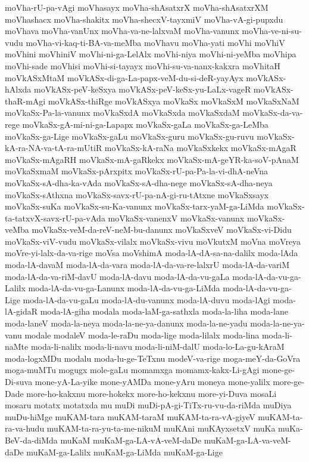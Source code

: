 {moVha-rU-pa-vAgi
moVhasayx
moVha-shAsatxrX
moVha-shAsatxrXM
moVhashacx
moVha-shakitx
moVha-shecxV-tayxmiV
moVha-vA-gi-pupxdu
moVhava
moVha-vanUnx
moVha-va-ne-lalxvaM
moVha-vanunx
moVha-ve-ni-su-vudu
moVha-vi-kaq-ti-BA-va-meMba
moVhavu
moVha-yati
moVhi
moVhiV
moVhini
moVhiniV
moVhi-ni-ga-LelAlx
moVhi-niya
moVhi-ni-yeMba
moVhipa
moVhi-sade
moVhisi
moVhi-si-tayayx
moVhi-su-va-nanx-kakxra
moVhitaH
moVkASxMtaM
moVkASx-di-ga-La-papx-veM-du-si-deR-yayAyx
moVkASx-hAlxda
moVkASx-peV-keSxya
moVkASx-peV-keSx-yu-LaLx-vageR
moVkASx-thaR-mAgi
moVkASx-thiRge
moVkASxya
moVkaSx
moVkaSxM
moVkaSxNaM
moVkaSx-Pa-la-vanunx
moVkaSxdA
moVkaSxda
moVkaSxdaM
moVkaSx-da-va-rege
moVkaSx-gA-mi-ni-ga-Lapapx
moVkaSx-gaLa
moVkaSx-ga-LeMba
moVkaSx-ga-Lige
moVkaSx-gaLu
moVkaSx-guru
moVkaSx-gu-ruvu
moVkaSx-kA-ra-NA-va-tA-ra-mUtiR
moVkaSx-kA-raNa
moVkaSxkekx
moVkaSx-mAgaR
moVkaSx-mAgaRH
moVkaSx-mA-gaRkekx
moVkaSx-mA-geYR-ka-soV-pAnaM
moVkaSxmaM
moVkaSx-pArxpitx
moVkaSx-rU-pa-Pa-la-vi-dhA-neVna
moVkaSx-sA-dha-ka-vAda
moVkaSx-sA-dha-nege
moVkaSx-sA-dha-neya
moVkaSx-sAthxna
moVkaSx-savx-rU-pa-nA-gi-ru-tAtxne
moVkaSxsayx
moVkaSx-suKa
moVkaSx-su-Ka-vanunx
moVkaSx-tarx-yaM-ga-LiMda
moVkaSx-ta-tatxvX-savx-rU-pa-vAda
moVkaSx-vanenxV
moVkaSx-vanunx
moVkaSx-veMba
moVkaSx-veM-da-reV-neM-bu-danunx
moVkaSxveV
moVkaSx-vi-Didu
moVkaSx-viV-vudu
moVkaSx-vilalx
moVkaSx-vivu
moVkutxM
moVna
moVreya
moVre-yi-lalx-da-va-rige
moVsa
moVshimA
moda-lA-dA-sa-na-dalilx
moda-lAda
moda-lA-davaM
moda-lA-da-vara
moda-lA-da-va-re-lalxrU
moda-lA-da-variM
moda-lA-da-va-riM-davU
moda-lA-davu
moda-lA-da-vu-gaLa
moda-lA-da-vu-ga-Lalilx
moda-lA-da-vu-ga-Lanunx
moda-lA-da-vu-ga-LiMda
moda-lA-da-vu-ga-Lige
moda-lA-da-vu-gaLu
moda-lA-du-vanunx
moda-lA-duvu
moda-lAgi
moda-lA-gidaR
moda-lA-giha
modala
moda-laM-ga-sathxla
moda-la-liha
moda-lane
moda-laneV
moda-la-neya
moda-la-ne-ya-danunx
moda-la-ne-yadu
moda-la-ne-ya-vanu
modale
modaleV
moda-le-raDu
moda-lige
moda-lilalx
moda-lina
moda-li-naMte
moda-li-nalilx
moda-li-navu
moda-li-niM-dalU
moda-lo-La-gu-kAraM
moda-logxMDu
modalu
moda-lu-ge-TeTxnu
modeV-va-rige
moga-meY-da-GoVra
moga-muMTu
mogugx
mole-gaLu
momamxga
momamx-kakx-Li-gAgi
mone-ge-Di-suva
mone-yA-La-yike
mone-yAMDa
mone-yAru
moneya
mone-yalilx
more-ge-Dade
more-ho-kakxnu
more-hokekx
more-ho-kekxnu
more-yi-Duva
mosaLi
mosaru
motatx
motatxda
mu
muDi
muDi-pA-gi-TiTx-ru-vu-da-riMda
muDiya
muDu-hiMge
muKAM-tara
muKAM-taraM
muKAM-ta-ra-vA-giyeV
muKAM-ta-ra-va-hudu
muKAM-ta-ra-yu-ta-me-nikuM
muKAni
muKAyxsetxV
muKa
muKa-BeV-da-diMda
muKaM
muKaM-ga-LA-vA-veM-daDe
muKaM-ga-LA-va-veM-daDe
muKaM-ga-Lalilx
muKaM-ga-LiMda
muKaM-ga-Lige
}

